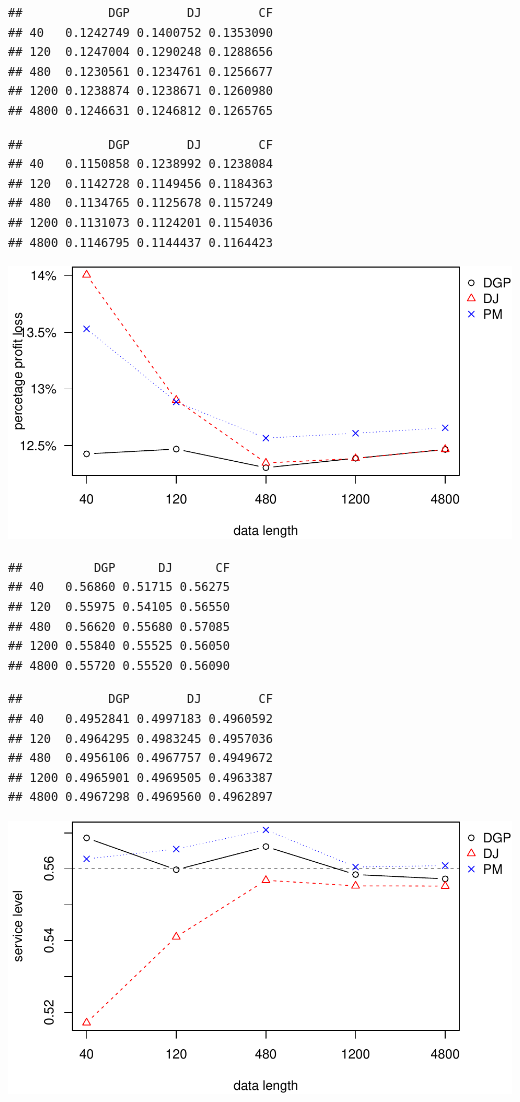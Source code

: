 \documentclass[
]{article}
\begin{document}
\begin{verbatim}
##            DGP        DJ        CF
## 40   0.1242749 0.1400752 0.1353090
## 120  0.1247004 0.1290248 0.1288656
## 480  0.1230561 0.1234761 0.1256677
## 1200 0.1238874 0.1238671 0.1260980
## 4800 0.1246631 0.1246812 0.1265765
\end{verbatim}

\begin{verbatim}
##            DGP        DJ        CF
## 40   0.1150858 0.1238992 0.1238084
## 120  0.1142728 0.1149456 0.1184363
## 480  0.1134765 0.1125678 0.1157249
## 1200 0.1131073 0.1124201 0.1154036
## 4800 0.1146795 0.1144437 0.1164423
\end{verbatim}

\includegraphics{information_non-plot_files/figure-latex/SAR(3)(1)_4ppl-1.pdf}

\begin{verbatim}
##          DGP      DJ      CF
## 40   0.56860 0.51715 0.56275
## 120  0.55975 0.54105 0.56550
## 480  0.56620 0.55680 0.57085
## 1200 0.55840 0.55525 0.56050
## 4800 0.55720 0.55520 0.56090
\end{verbatim}

\begin{verbatim}
##            DGP        DJ        CF
## 40   0.4952841 0.4997183 0.4960592
## 120  0.4964295 0.4983245 0.4957036
## 480  0.4956106 0.4967757 0.4949672
## 1200 0.4965901 0.4969505 0.4963387
## 4800 0.4967298 0.4969560 0.4962897
\end{verbatim}

\includegraphics{information_non-plot_files/figure-latex/SAR(3)(1)_4sl-1.pdf}
\end{document}
